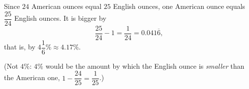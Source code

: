 Since $24$ American ounces equal $25$ English ounces, one American ounce equals $\dfrac{25}{24}$ English ounces. It is bigger by
\[
\dfrac{25}{24}-1=\dfrac{1}{24}=0.041\overline{6},
\]
that is, by $\boxed{4\dfrac{1}{6}\%}\approx4.17\%$.

(Not $4\%$: $4\%$ would be the amount by which the English ounce is \emph{smaller} than the American one, $1-\dfrac{24}{25}=\dfrac{1}{25}$.)
